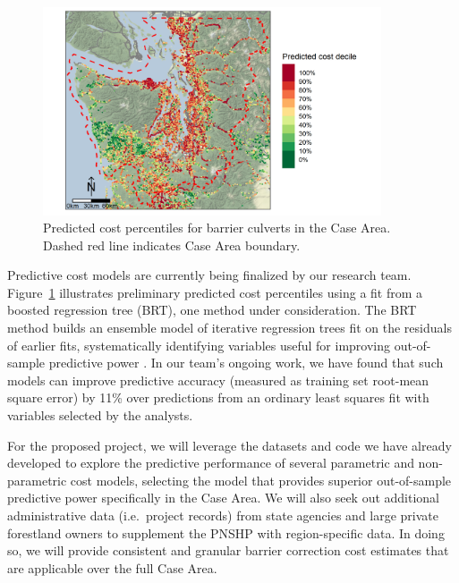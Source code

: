 \documentclass[12pt]{elsarticle}
\begin{document}
\begin{figure}
	\centering
	\includegraphics[width=10cm]{figures/predCost.png}
	\caption{Predicted cost percentiles for barrier culverts in the Case Area. Dashed red line indicates Case Area boundary.\label{fig:cost}}
\end{figure}%

Predictive cost models are currently being finalized by our research team. Figure~\ref{fig:cost} illustrates preliminary predicted cost percentiles using a fit from a boosted regression tree (BRT), one method under consideration. The BRT method builds an ensemble model of iterative regression trees fit on the residuals of earlier fits, systematically identifying variables useful for improving out-of-sample predictive power \citep{elith_working_2008}. In our team's ongoing work, we have found that such models can improve predictive accuracy (measured as training set root-mean square error) by 11\% over predictions from an ordinary least squares fit with variables selected by the analysts. 

For the proposed project, we will leverage the datasets and code we have already developed to explore the predictive performance of several parametric and non-parametric cost models, selecting the model that provides superior out-of-sample predictive power specifically in the Case Area. We will also seek out additional administrative data (i.e.\ project records) from state agencies and large private forestland owners to supplement the PNSHP with region-specific data. In doing so, we will provide consistent and granular barrier correction cost estimates that are applicable over the full Case Area. 
\end{document}
